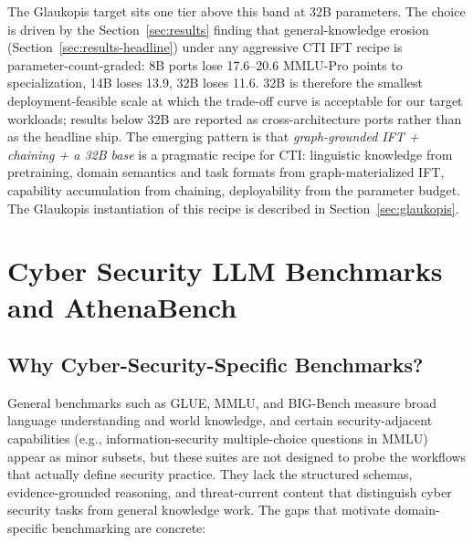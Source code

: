 \documentclass[webpdf,contemporary,large]{oup-authoring-template}
\theoremstyle{thmstyleone}
\theoremstyle{thmstyletwo}
\theoremstyle{thmstylethree}
\begin{document}
The Glaukopis target sits one tier above this band at 32B parameters. The choice is driven by the Section~\ref{sec:results} finding that general-knowledge erosion (Section~\ref{sec:results-headline}) under any aggressive CTI IFT recipe is parameter-count-graded: 8B ports lose 17.6--20.6 MMLU-Pro points to specialization, 14B loses 13.9, 32B loses 11.6. 32B is therefore the smallest deployment-feasible scale at which the trade-off curve is acceptable for our target workloads; results below 32B are reported as cross-architecture ports rather than as the headline ship. The emerging pattern is that \emph{graph-grounded IFT + chaining + a 32B base} is a pragmatic recipe for CTI: linguistic knowledge from pretraining, domain semantics and task formats from graph-materialized IFT, capability accumulation from chaining, deployability from the parameter budget. The Glaukopis instantiation of this recipe is described in Section~\ref{sec:glaukopis}.


\section{Cyber Security LLM Benchmarks and AthenaBench}
\label{sec:benchmarks}

\subsection{Why Cyber-Security-Specific Benchmarks?}

General benchmarks such as GLUE, MMLU, and BIG-Bench measure broad language understanding and world knowledge, and certain security-adjacent capabilities (e.g., information-security multiple-choice questions in MMLU) appear as minor subsets, but these suites are not designed to probe the workflows that actually define security practice. They lack the structured schemas, evidence-grounded reasoning, and threat-current content that distinguish cyber security tasks from general knowledge work. The gaps that motivate domain-specific benchmarking are concrete:
\end{document}
